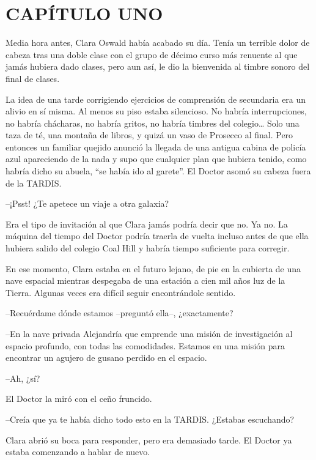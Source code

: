 \chapter*{CAPÍTULO UNO}

{Media hora antes, Clara Oswald había acabado su día. Tenía un terrible
 dolor de cabeza tras una doble clase con el grupo de décimo curso más
 renuente al que jamás hubiera dado clases, pero aun así, le dio la
bienvenida al timbre sonoro del final de clases.}

{La idea de una tarde corrigiendo ejercicios de comprensión de secundaria
 era un alivio en sí misma. Al menos su piso estaba silencioso. No habría
 interrupciones, no habría chácharas, no habría gritos, no habría timbres
 del colegio\ldots{} Solo una taza de té, una montaña de libros, y quizá
 un vaso de Prosecco al final. Pero entonces un familiar quejido anunció
 la llegada de una antigua cabina de policía azul apareciendo de la nada
 y supo que cualquier plan que hubiera tenido, como habría dicho su
 abuela, ``se había ido al garete''. El Doctor asomó su cabeza fuera de
la TARDIS.}

{--¡Psst! ¿Te apetece un viaje a otra galaxia?}

{Era el tipo de invitación al que Clara jamás podría decir que no. Ya no.
 La máquina del tiempo del Doctor podría traerla de vuelta incluso antes
 de que ella hubiera salido del colegio Coal Hill y habría tiempo
suficiente para corregir.}

{En ese momento, Clara estaba en el futuro lejano, de pie en la cubierta
 de una nave espacial mientras despegaba de una estación a cien mil años
 luz de la Tierra. Algunas veces era difícil seguir encontrándole
sentido.}

{--Recuérdame dónde estamos --preguntó ella--, ¿exactamente?}

{--En la nave privada Alejandría que emprende una misión de investigación
 al espacio profundo, con todas las comodidades. Estamos en una misión
para encontrar un agujero de gusano perdido en el espacio.}

{--Ah, ¿sí?}

{El Doctor la miró con el ceño fruncido.}

{--Creía que ya te había dicho todo esto en la TARDIS\@. ¿Estabas
escuchando?}

{Clara abrió su boca para responder, pero era demasiado tarde. El Doctor
ya estaba comenzando a hablar de nuevo.}

